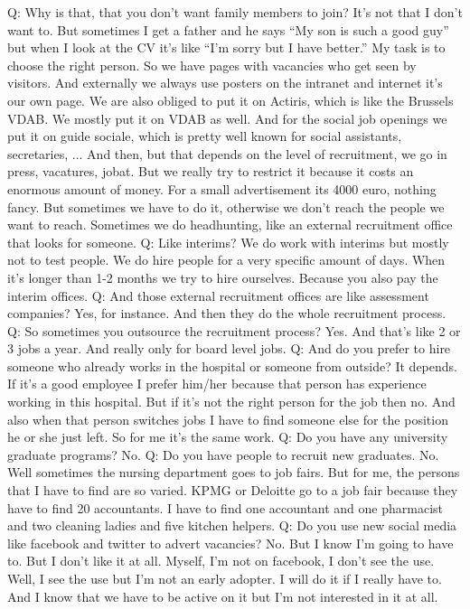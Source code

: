 \documentclass[a4paper,fleqn,11pt,dvips,titlepage]{article}
\numberwithin{figure}{section}
\numberwithin{equation}{section}
\begin{document}
Q: Why is that, that you don’t want family members to join?
It’s not that I don’t want to. But sometimes I get a father and he says “My son is such a good guy” but when I look at the CV it’s like “I’m sorry but I have better.” My task is to choose the right person. 
So we have pages with vacancies who get seen by visitors. And externally we always use posters on the intranet and internet it’s our own page. We are also obliged to put it on Actiris, which is like the Brussels VDAB. We mostly put it on VDAB as well. And for the social job openings we put it on guide sociale, which is pretty well known for social assistants, secretaries, ... And then, but that depends on the level of recruitment, we go in press, vacatures, jobat. But we really try to restrict it because it costs an enormous amount of money. For a small advertisement its 4000 euro, nothing fancy. But sometimes we have to do it, otherwise we don’t reach the people we want to reach. Sometimes we do headhunting, like an external recruitment office that looks for someone. 
Q: Like interims?
We do work with interims but mostly not to test people. We do hire people for a very specific amount of days. When it’s longer than 1-2 months we try to hire ourselves. Because you also pay the interim offices. 
Q: And those external recruitment offices are like assessment companies?
Yes, for instance. And then they do the whole recruitment process. 
Q: So sometimes you outsource the recruitment process?
Yes. And that’s like 2 or 3 jobs a year. And really only for board level jobs. 
Q: And do you prefer to hire someone who already works in the hospital or someone from outside?
It depends. If it’s a good employee I prefer him/her because that person has experience working in this hospital. But if it’s not the right person for the job then no. And also when that person switches jobs I have to find someone else for the position he or she just left. So for me it’s the same work. 
Q: Do you have any university graduate programs? 
No. 
Q: Do you have people to recruit new graduates.
No. Well sometimes the nursing department goes to job fairs. But for me, the persons that I have to find are so varied. KPMG or Deloitte go to a job fair because they have to find 20 accountants. I have to find one accountant and one pharmacist and two cleaning ladies and five kitchen helpers. 
Q: Do you use new social media like facebook and twitter to advert vacancies? 
No. But I know I’m going to have to. But I don’t like it at all. Myself, I’m not on facebook, I don’t see the use. Well, I see the use but I’m not an early adopter. I will do it if I really have to. And I know that we have to be active on it but I’m not interested in it at all. 
\end{document}
